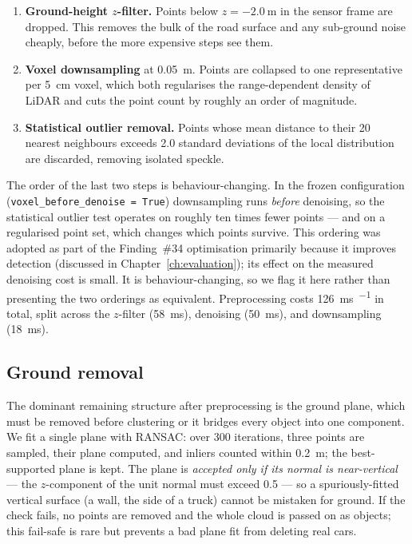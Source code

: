 \begin{enumerate}
  \item \textbf{Ground-height $z$-filter.} Points below
    $z = \SI{-2.0}{\meter}$ in the sensor frame are dropped. This removes the bulk
    of the road surface and any sub-ground noise cheaply, before the more
    expensive steps see them.
  \item \textbf{Voxel downsampling} at \SI{0.05}{\meter}. Points are collapsed to
    one representative per \SI{5}{\centi\meter} voxel, which both regularises the
    range-dependent density of LiDAR and cuts the point count by roughly an order
    of magnitude.
  \item \textbf{Statistical outlier removal.} Points whose mean distance to their
    \num{20} nearest neighbours exceeds \num{2.0} standard deviations of the
    local distribution are discarded, removing isolated speckle.
\end{enumerate}

The order of the last two steps is behaviour-changing. In the frozen configuration
(\texttt{voxel\_\allowbreak before\_\allowbreak denoise = True}) downsampling runs \emph{before}
denoising, so the statistical outlier test operates on roughly ten times fewer
points --- and on a regularised point set, which changes which points survive.
This ordering was adopted as part of the Finding~\#34 optimisation primarily
because it improves detection (discussed in Chapter~\ref{ch:evaluation}); its effect on the measured
denoising cost is small. It is behaviour-changing, so we flag it here rather than
presenting the two orderings as equivalent.
Preprocessing costs \SI{126}{\milli\second\per\frame} in total, split across the
$z$-filter (\SI{58}{\milli\second}), denoising (\SI{50}{\milli\second}), and
downsampling (\SI{18}{\milli\second}).

\subsection{Ground removal}
\label{sec:pipeline-ground}

The dominant remaining structure after preprocessing is the ground plane, which
must be removed before clustering or it bridges every object into one component.
We fit a single plane with RANSAC: over \num{300} iterations, three points are
sampled, their plane computed, and inliers counted within
\SI{0.2}{\meter}; the best-supported plane is kept. The plane is
\emph{accepted only if its normal is near-vertical} --- the $z$-component of the
unit normal must exceed \num{0.5} --- so a spuriously-fitted vertical surface (a
wall, the side of a truck) cannot be mistaken for ground. If the check fails, no
points are removed and the whole cloud is passed on as objects; this fail-safe is
rare but prevents a bad plane fit from deleting real cars.

